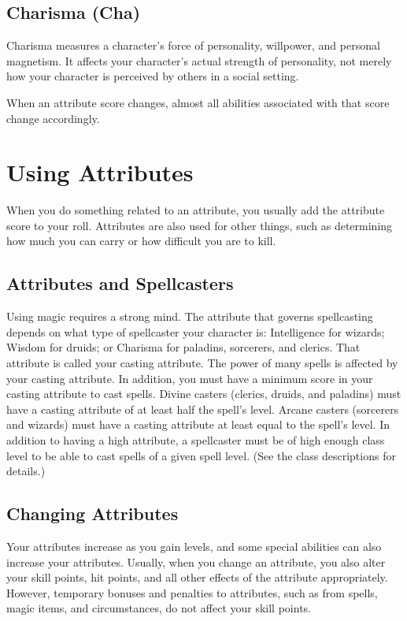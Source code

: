 \subsection{Charisma (Cha)}
Charisma measures a character's force of personality, willpower, and personal magnetism. It affects your character's actual strength of personality, not merely how your character is perceived by others in a social setting.

When an attribute score changes, almost all abilities associated with that score change accordingly.

\section{Using Attributes}
When you do something related to an attribute, you usually add the attribute score to your roll. Attributes are also used for other things, such as determining how much you can carry or how difficult you are to kill. 

\subsection{Attributes and Spellcasters}
Using magic requires a strong mind. The attribute that governs spellcasting depends on what type of spellcaster your character is: Intelligence for wizards; Wisdom for druids; or Charisma for paladins, sorcerers, and clerics. That attribute is called your casting attribute. The power of many spells is affected by your casting attribute. In addition, you must have a minimum score in your casting attribute to cast spells. Divine casters (clerics, druids, and paladins) must have a casting attribute of at least half the spell's level. Arcane casters (sorcerers and wizards) must have a casting attribute at least equal to the spell's level. In addition to having a high attribute, a spellcaster must be of high enough class level to be able to cast spells of a given spell level. (See the class descriptions for details.)

\subsection{Changing Attributes}
Your attributes increase as you gain levels, and some special abilities can also increase your attributes. Usually, when you change an attribute, you also alter your skill points, hit points, and all other effects of the attribute appropriately. However, temporary bonuses and penalties to attributes, such as from spells, magic items, and circumstances, do not affect your skill points.

